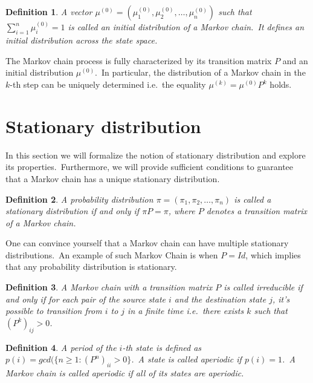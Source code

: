 \documentclass[shortabstract, english, lic]{iithesis}
\theoremstyle{default_theorem_style}\newtheorem{theorem}{Theorem}
\theoremstyle{default_theorem_style}\newtheorem{definition}{Definition}
\begin{document}
\begin{definition}
A vector $\mu^{(0)} = (\mu^{(0)}_1, \mu^{(0)}_2, \dots, \mu^{(0)}_n)$ such that $\sum_{i=1}^{n} \mu^{(0)}_i = 1$
is called an \textit{initial distribution} of a Markov chain.\ It defines an initial distribution across the state space.

\end{definition}

\noindent The Markov chain process is fully characterized by its transition matrix $P$ and an initial
distribution $\mu^{(0)}$.\ In particular, the distribution of a Markov chain in the $k$-th step can be uniquely
determined i.e.\ the equality $\mu^{(k)} = \mu^{(0)}P^k$ holds.

\section{Stationary distribution}

In this section we will formalize the notion of stationary distribution and explore its properties.\ Furthermore,
we will provide sufficient conditions to guarantee that a Markov chain has a unique stationary distribution.

\begin{definition}
A probability distribution $\pi = (\pi_1, \pi_2, \dots, \pi_n)$ is called a \textit{stationary} distribution if and only if
$\pi P = \pi$, where $P$ denotes a transition matrix of a Markov chain.
\end{definition}

\noindent One can convince yourself that a Markov chain can have multiple stationary distributions.\ An example of
such Markov Chain is when $P = Id$, which implies that any probability distribution is stationary.

\begin{definition}
A Markov chain with a transition matrix $P$ is called \textit{irreducible} if and only if for each pair of the source
state $i$ and the destination state $j$, it's possible to transition from $i$ to $j$ in a finite time i.e.\ there
exists $k$ such that $(P^k)_{ij} > 0$.
\end{definition}

\begin{definition}
A period of the $i$-th state is defined as $p(i) = gcd(\{n \geq 1 : (P^n)_{ii} > 0\}$.\ A state is called
\textit{aperiodic} if $p(i) = 1$.\ A Markov chain is called aperiodic if all of its states are aperiodic.
\end{definition}
\end{document}
